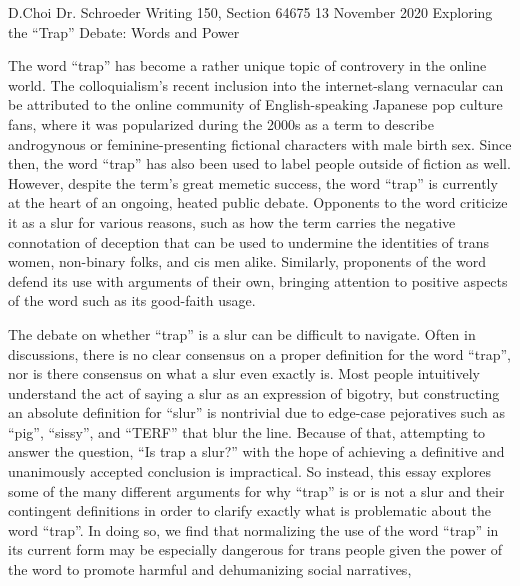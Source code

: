 \documentclass[12pt, letterpaper]{article}
\begin{document}
\begin{mla}
	{D.}{Choi}
	{Dr. Schroeder}
	{Writing 150, Section 64675}
	{13 November 2020}
	{Exploring the ``Trap'' Debate: Words and Power}


The word ``trap'' has become a rather unique topic of controvery in the online
world. The colloquialism's recent inclusion into the internet-slang vernacular
can be attributed to the online community of English-speaking Japanese pop
culture fans, where it was popularized during the 2000s as a term to describe
androgynous or feminine-presenting fictional characters with male birth sex.
Since then, the word ``trap'' has also been used to label people outside of
fiction as well. However, despite the term's great memetic success, the word
``trap'' is currently at the heart of an ongoing, heated public debate.
Opponents to the word criticize it as a slur for various reasons, such as how
the term carries the negative connotation of deception that can be used to
undermine the identities of trans women, non-binary folks, and cis men alike.
Similarly, proponents of the word defend its use with arguments of their own,
bringing attention to positive aspects of the word such as its good-faith
usage.

The debate on whether ``trap'' is a slur can be difficult to navigate. Often
in discussions, there is no clear consensus on a proper definition for the
word ``trap'', nor is there consensus on what a slur even exactly is. Most
people intuitively understand the act of saying a slur as an expression of
bigotry, but constructing an absolute definition for ``slur'' is nontrivial
due to edge-case pejoratives such as ``pig'', ``sissy'', and ``TERF'' that
blur the line. Because of that, attempting to answer the question, ``Is trap a
slur?'' with the hope of achieving a definitive and unanimously accepted
conclusion is impractical. So instead, this essay explores some of the many
different arguments for why ``trap'' is or is not a slur and their contingent
definitions in order to clarify exactly what is problematic about the word
``trap''. In doing so, we find that normalizing the use of the word ``trap''
in its current form may be especially dangerous for trans people given the
power of the word to promote harmful and dehumanizing social narratives,


\end{mla}
\end{document}
